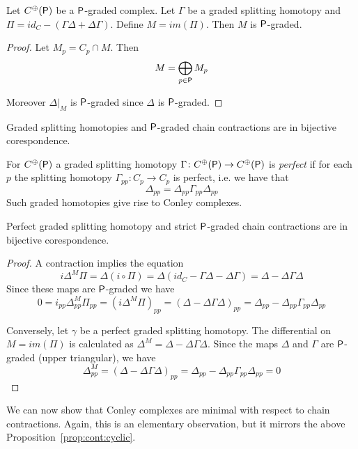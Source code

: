 \begin{prop}\label{prop:grad:contract}
Let $C^\oplus({\mathsf P})$ be a ${\mathsf P}$-graded complex.  Let $\Gamma$ be a graded splitting homotopy and $\Pi = id_C-(\Gamma\Delta+\Delta\Gamma)$.  Define $M = im(\Pi)$.  Then $M$ is ${\mathsf P}$-graded.
\end{prop}
\begin{proof}
Let $M_p = C_p\cap M$.  Then $$M=\bigoplus_{p\in {\mathsf P}} M_p$$

Moreover $\Delta|_M$ is ${\mathsf P}$-graded since $\Delta$ is ${\mathsf P}$-graded.
\end{proof}

\begin{cor}
Graded splitting homotopies and ${\mathsf P}$-graded chain contractions are in bijective corespondence.
\end{cor}


For $C^\oplus({\mathsf P})$ a graded splitting homotopy $\Gamma\colon C^\oplus({\mathsf P})\to C^\oplus({\mathsf P})$ is {\em perfect} if for each $p$ the splitting homotopy $\Gamma_{pp}:C_p\to C_p$ is perfect, i.e. we have that $$\Delta_{pp} = \Delta_{pp}\Gamma_{pp}\Delta_{pp}$$  Such graded homotopies give rise to Conley complexes.

\begin{cor}
Perfect graded splitting homotopy and strict ${\mathsf P}$-graded chain contractions are in bijective corespondence.
\end{cor}
\begin{proof}
A contraction implies the equation $$i\Delta^M\Pi = \Delta (i\circ \Pi) = \Delta(id_C-\Gamma\Delta-\Delta\Gamma) = \Delta-\Delta\Gamma\Delta$$  Since these maps are ${\mathsf P}$-graded we have $$0=i_{pp}\Delta^M_{pp}\Pi_{pp}= (i\Delta^M\Pi)_{pp}  =(\Delta-\Delta\Gamma\Delta)_{pp}= \Delta_{pp}-\Delta_{pp}\Gamma_{pp}\Delta_{pp}$$

Conversely, let $\gamma$ be a perfect graded splitting homotopy.  The differential on $M=im(\Pi)$ is calculated as $\Delta^M = \Delta-\Delta\Gamma\Delta$.  Since the maps $\Delta$ and $\Gamma$ are ${\mathsf P}$-graded (upper triangular), we have $$\Delta^M_{pp} = (\Delta-\Delta\Gamma\Delta)_{pp} = \Delta_{pp}-\Delta_{pp}\Gamma_{pp}\Delta_{pp} = 0$$

\end{proof}


We can now show that Conley complexes are minimal with respect to chain contractions.  Again, this is an elementary observation, but it mirrors the above Proposition~\ref{prop:cont:cyclic}.

